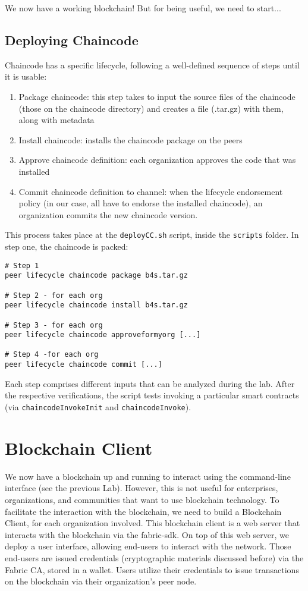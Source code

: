 \documentclass[12pt,a4paper]{article}
\theoremstyle{definition}
\begin{document}
We now have a working blockchain! But for being useful, we need to start...

\subsection{Deploying Chaincode}

Chaincode has a specific lifecycle, following a well-defined sequence of steps until it is usable:

\begin{enumerate}
\item Package chaincode: this step takes to input the source files of the chaincode (those on the chaincode directory) and creates a file (.tar.gz) with them, along with metadata
\item Install chaincode: installs the chaincode package on the peers
\item Approve chaincode definition: each organization approves the code that was installed
\item Commit chaincode definition to channel: when the lifecycle endorsement policy (in our case, all have to endorse the installed chaincode), an organization commits the new chaincode version.
\end{enumerate}

This process takes place at the \texttt{deployCC.sh} script, inside the \texttt{scripts} folder. In step one, the chaincode is packed:

\begin{verbatim}
# Step 1
peer lifecycle chaincode package b4s.tar.gz

# Step 2 - for each org
peer lifecycle chaincode install b4s.tar.gz

# Step 3 - for each org
peer lifecycle chaincode approveformyorg [...]

# Step 4 -for each org
peer lifecycle chaincode commit [...]
\end{verbatim}

Each step comprises different inputs that can be analyzed during the lab. After the respective verifications, the script tests invoking a particular smart contracts (via \texttt{chaincodeInvokeInit} and \texttt{chaincodeInvoke}).

\section{Blockchain Client}
We now have a blockchain up and running to interact using the command-line interface (see the previous Lab). However, this is not useful for enterprises, organizations, and communities that want to use blockchain technology. To facilitate the interaction with the blockchain, we need to build a Blockchain Client, for each organization involved. This blockchain client is a web server that interacts with the blockchain via the fabric-sdk. On top of this web server, we deploy a user interface, allowing end-users to interact with the network. Those end-users are issued credentials (cryptographic materials discussed before) via the Fabric CA, stored in a wallet. Users utilize their credentials to issue transactions on the blockchain via their organization's peer node.
\end{document}
